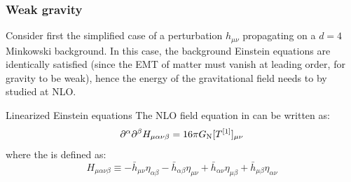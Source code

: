 
\subsubsection{Weak gravity}
\label{sssec:pseudo-emt-weak-grav}

Consider first the simplified case of a perturbation $ h_{\mu \nu} $ propagating on a $ d = 4 $ Minkowski background. In this case, the background Einstein equations are identically satisfied (since the EMT of matter must vanish at leading order, for gravity to be weak), hence the energy of the gravitational field needs to by studied at NLO.

\begin{proposition}{Linearized Einstein equations}{}
  The NLO field equation in  can be written as:
  \begin{equation}
    \partial^\alpha \partial^\beta H_{\mu \alpha \nu \beta} = 16 \pi G_\text{N} [T^{[1]}]_{\mu \nu}
    \label{eq:linear-einstein}
  \end{equation}
  where the  is defined as:
  \begin{equation}
    H_{\mu \alpha \nu \beta} \equiv - \bar{h}_{\mu \nu} \eta_{\alpha \beta} - \bar{h}_{\alpha \beta} \eta_{\mu \nu} + \bar{h}_{\alpha \nu} \eta_{\mu \beta} + \bar{h}_{\mu \beta} \eta_{\alpha \nu}
  \end{equation}
\end{proposition}

